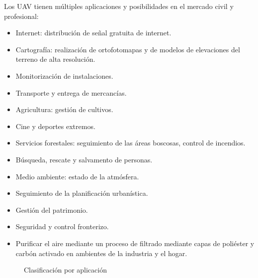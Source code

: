 Los UAV tienen múltiples aplicaciones y posibilidades en el mercado civil y profesional:
\begin{itemize}
\item Internet: distribución de señal gratuita de internet.
\item Cartografía: realización de ortofotomapas y de modelos de elevaciones del terreno de alta resolución.
\item Monitorización de instalaciones.
\item Transporte y entrega de mercancías.
\item Agricultura: gestión de cultivos.
\item Cine y deportes extremos.
\item Servicios forestales: seguimiento de las áreas boscosas, control de incendios.
\item Búsqueda, rescate y salvamento de personas.
\item Medio ambiente: estado de la atmósfera.
\item Seguimiento de la planificación urbanística.
\item Gestión del patrimonio.
\item Seguridad y control fronterizo.
\item Purificar el aire mediante un proceso de filtrado mediante capas de poliéster y carbón activado en ambientes de la industria y el hogar. 
\end{itemize}

\begin{figure}[H]
\centering
{}
\caption{Clasificación por aplicación}
\end{figure}

